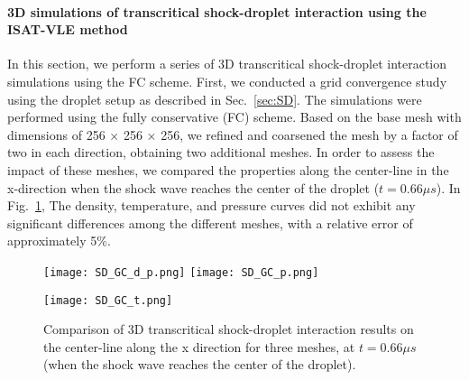 \paragraph{3D simulations of transcritical shock-droplet interaction using the ISAT-VLE method}
\label{sec:SD_3D}

In this section, we perform a series of 3D transcritical shock-droplet interaction simulations using the FC scheme. %
First, we conducted a grid convergence study using the  droplet setup as described in Sec.~\ref{sec:SD}. The simulations were performed using the fully conservative (FC) scheme. Based on the base mesh with dimensions of 256 $\times$ 256 $\times$ 256, we refined and coarsened the mesh by a factor of two in each direction, obtaining two additional meshes. In order to assess the impact of these meshes, we compared the properties along the center-line in the x-direction when the shock wave reaches the center of the droplet ($t=0.66\mu s$). In Fig.~\ref{SG_GC}, The density, temperature, and pressure curves did not exhibit any significant differences among the different meshes, with a relative error of approximately 5\%.


\begin{figure}[htbp]
\centering
\texttt{[image: SD\_GC\_d\_p.png]}
\texttt{[image: SD\_GC\_p.png]}

\texttt{[image: SD\_GC\_t.png]}
\caption{Comparison of 3D transcritical shock-droplet interaction results on the center-line along the x direction for three meshes, at $t=0.66\mu s$ (when the shock wave reaches the center of the droplet).}
\label{SG_GC} 
\end{figure}



